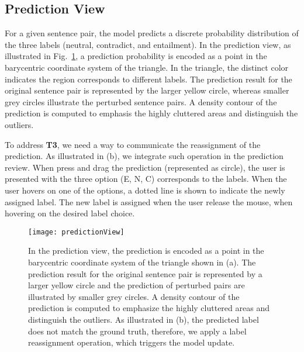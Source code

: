 \subsection{Prediction View}
\label{sec:prediction}
For a given sentence pair, the model predicts a discrete probability distribution of the three labels (neutral, contradict, and entailment).
%
In the prediction view, as illustrated in Fig.~\ref{fig:predictionView}, a prediction probability is encoded as a point in the barycentric coordinate system of the triangle. In the triangle, the distinct color indicates the region corresponds to different labels. The prediction result for the original sentence pair is represented by the larger yellow circle, whereas smaller grey circles illustrate the perturbed sentence pairs. A density contour of the prediction is computed to emphasis the highly cluttered areas and distinguish the outliers.

To address \textbf{T3}, we need a way to communicate the reassignment of the prediction. As illustrated in (b), we integrate such operation in the prediction review. When press and drag the prediction (represented as circle), the user is presented with the three option (E, N, C) corresponds to the labels. When the user hovers on one of the options, a dotted line is shown to indicate the newly assigned label. The new label is assigned when the user release the mouse, when hovering on the desired label choice.

\begin{figure}[htbp]
\centering
\vspace{-2mm}
 \texttt{[image: predictionView]}
 \vspace{-2mm}
 \caption{
In the prediction view, the prediction is encoded as a point in the barycentric coordinate system of the triangle shown in (a).
%
The prediction result for the original sentence pair is represented by a larger yellow circle and the prediction of perturbed pairs are illustrated by smaller grey circles.
A density contour of the prediction is computed to emphasize the highly cluttered areas and distinguish the outliers.
As illustrated in (b), the predicted label does not match the ground truth, therefore, we apply a label reassignment operation, which triggers the model update.
 }
\label{fig:predictionView}
\end{figure}
